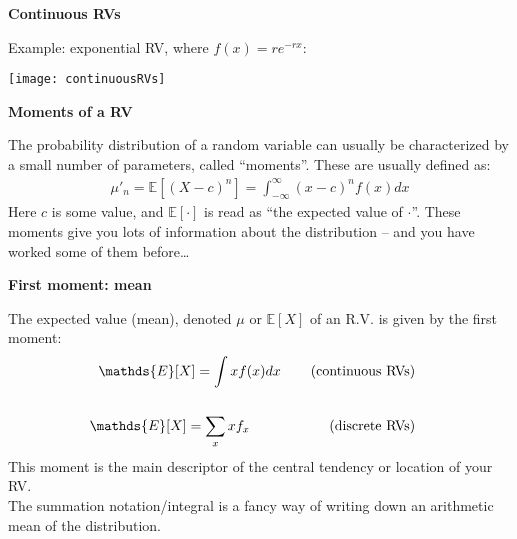\documentclass[12pt,xcolor=svgnames]{beamer}
\newcommand{\theme}{\color{FireBrick}}
\newcommand{\ds}[1]{\mathds{#1}}
\newcommand{\sk}{\vspace{.4cm}}
\newcommand{\chap}[1]{{\theme \Large \bf #1} \sk}
\newcommand{\E}{\ds{E}}
\begin{document}
\begin{frame}
\chap{Continuous RVs}

Example: exponential RV, where $f(x) = re^{-rx}$:

\begin{center}
\texttt{[image: continuousRVs]}
\end{center}

\end{frame}
%
%
%
%


\begin{frame}
\chap{Moments of a RV}

The probability distribution of a random variable can usually be characterized by a small number of parameters, called ``moments''. These are usually defined as:
\begin{align*}
\mu'_n = \E[(X-c)^n] = \int_{-\infty}^{\infty} (x-c)^n f(x) dx
\end{align*}
Here $c$ is some value, and $\E[\cdot]$ is read as ``the expected value of $\cdot$''.  These moments give you lots of information about the distribution -- and you have worked some of them before\dots
\end{frame}


\begin{frame}
\chap{First moment: {\bf mean} }

The expected value (mean), denoted $\mu$ or $\E[X]$  of an R.V. is given by the first moment:
\begin{align*}
\E[X] = \int x f(x) dx \text{\hspace{0.75cm}(continuous RVs)}\\
& \\
\E[X] = \sum_x x f_x \text{\hspace{2cm}(discrete RVs)}
\end{align*}
This moment is the main descriptor of the central tendency or location of your RV. \\
\sk
{\tiny The summation notation/integral is a fancy way of writing down an arithmetic mean of the distribution.}

\end{frame}
\end{document}
